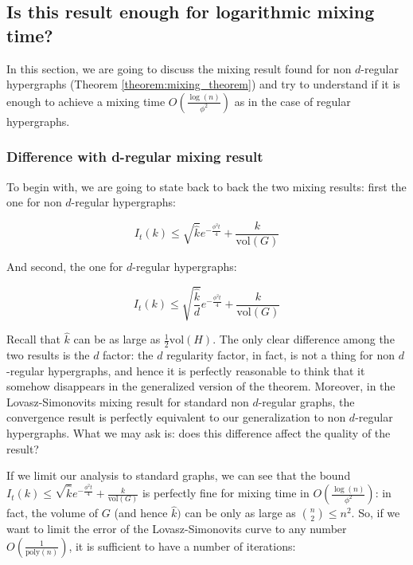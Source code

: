 \documentclass[../main.tex]{subfiles}
\begin{document}
    
\subsection{Is this result enough for logarithmic mixing time?}
\label{subsec:discussion_sublinear_mixing_time}

In this section, we are going to discuss the mixing result found for non $d$-regular hypergraphs (Theorem \ref{theorem:mixing_theorem}) and try to understand if it is enough to achieve a mixing time $O\left(\frac{\log(n)}{\phi^2}\right)$ as in the case of regular hypergraphs.

\subsubsection{Difference with d-regular mixing result}

To begin with, we are going to state back to back the two mixing results: first the one for non $d$-regular hypergraphs:

\begin{equation}
    I_t(k) \leq \sqrt{\hat{k}} e^{-\frac{\phi^2 t}{4}} + \frac{k}{\text{vol}(G)}
\end{equation}

And second, the one for $d$-regular hypergraphs:

\begin{equation}
    I_t(k) \leq \sqrt{\frac{\hat{k}}{d}} e^{-\frac{\phi^2 t}{4}} + \frac{k}{\text{vol}(G)}
\end{equation}

Recall that $\hat{k}$ can be as large as $\frac{1}{2}\text{vol}(H)$. The only clear difference among the two results is the $d$ factor: the $d$ regularity factor, in fact, is not a thing for non $d$-regular hypergraphs, and hence it is perfectly reasonable to think that it somehow disappears in the generalized version of the theorem. Moreover, in the Lovasz-Simonovits mixing result for standard non $d$-regular graphs, the convergence result is perfectly equivalent to our generalization to non $d$-regular hypergraphs. What we may ask is: does this difference affect the quality of the result?

If we limit our analysis to standard graphs, we can see that the bound $I_t(k) \leq \sqrt{\hat{k}} e^{-\frac{\phi^2 t}{4}} + \frac{k}{\text{vol}(G)}$ is perfectly fine for mixing time in $O\left(\frac{\log(n)}{\phi^2}\right)$: in fact, the volume of $G$ (and hence $\hat{k})$ can be only as large as ${n \choose 2} \leq n^2$. So, if we want to limit the error of the Lovasz-Simonovits curve to any number $O\left(\frac{1}{\text{poly}(n)}\right)$, it is sufficient to have a number of iterations:
\end{document}
